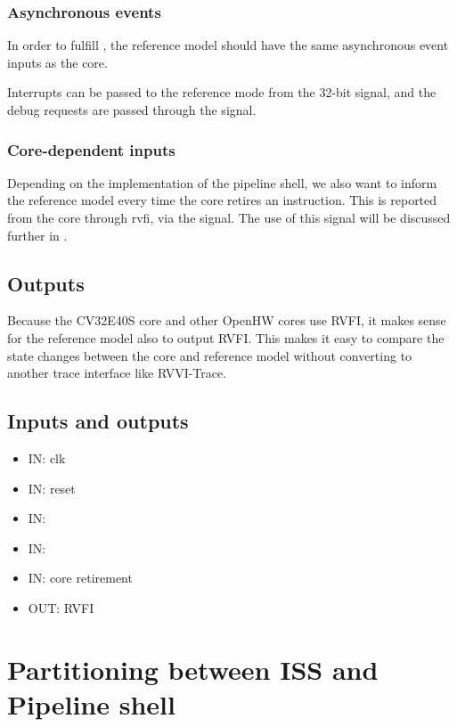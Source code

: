 \subsubsection{Asynchronous events}
In order to fulfill , the reference model should have the same asynchronous event inputs as the core. 

Interrupts can be passed to the reference mode from the 32-bit  signal, and the debug requests are passed through the  signal.


\subsubsection{Core-dependent inputs}

Depending on the implementation of the pipeline shell, we also want to inform the reference model every time the core retires an instruction. This is reported from the core through \acrshort{rvfi}, via the  signal. The use of this signal will be discussed further in .

\subsection{Outputs}

Because the CV32E40S core and other OpenHW cores use RVFI, it makes sense for the reference model also to output RVFI. This makes it easy to compare the state changes between the core and reference model without converting to another trace interface like RVVI-Trace. 

\subsection{Inputs and outputs}

\begin{itemize}
    \item IN: clk
    \item IN: reset
    \item IN: 
    \item IN: 
    \item IN: core retirement 
    \item OUT: RVFI
\end{itemize}


\section{Partitioning between ISS and Pipeline shell}

